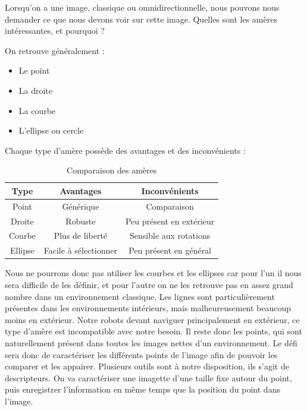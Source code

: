 
Lorsqu'on a une image, classique ou omnidirectionnelle, nous pouvons nous demander ce que nous devons voir sur cette image.
Quelles sont les amères intéressantes, et pourquoi ?

On retrouve généralement :
\begin{itemize}
\item Le point
\item La droite
\item La courbe
\item L'ellipse ou cercle
\end{itemize}
Chaque type d'amère possède des avantages et des inconvénients :
\begin{table}[h]
  \begin{center}
    \begin{tabular}{|c|c|c|}
      \hline
      Type & Avantages & Inconvénients \\
      \hline
      Point & Générique & Comparaison \\
      Droite & Robuste & Peu présent en extérieur \\
      Courbe & Plus de liberté & Sensible aux rotations \\
      Ellipse & Facile à sélectionner & Peu présent en général\\
      \hline
    \end{tabular}    		
  \end{center}
  \caption{Comparaison des amères}
\end{table}

Nous ne pourrons donc pas utiliser les courbes et les ellipses car pour l'un il nous sera difficile de les définir, et pour l'autre on ne les retrouve pas en assez grand nombre dans un environnement classique.
Les lignes sont particulièrement présentes dans les environnements intérieurs, mais malheureusement beaucoup moins en extérieur.
Notre robots devant naviguer principalement en extérieur, ce type d'amère est incompatible avec notre besoin.
Il reste donc les points, qui sont naturellement présent dans toutes les images nettes d'un environnement.
Le défi sera donc de caractériser les différents points de l'image afin de pouvoir les comparer et les appairer.
Plusieurs outils sont à notre disposition, ils s'agit de descripteurs.
On va caractériser une imagette d'une taille fixe autour du point, puis enregistrer l'information en même temps que la position du point dans l'image.

